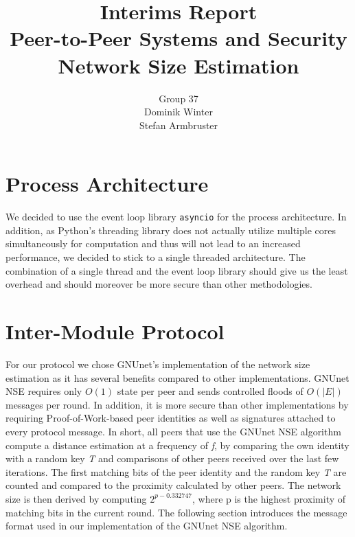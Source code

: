 \documentclass[IN,11pt,twoside,openright,english]{article}
\begin{document}
\title{%
  \Huge \textbf{Interims Report} \\
  \vspace{1.5cm} \large \textbf{Peer-to-Peer Systems and Security} \\
    \vspace{0.5cm} \textbf{Network Size Estimation} \vspace{1cm} }

\author{%
	\large Group 37 \\
	\large Dominik Winter \\
	\large Stefan Armbruster}
\date{}
\maketitle

\newpage

\section{Process Architecture}
We decided to use the event loop library \texttt{asyncio} for the process architecture. In addition, as Python's threading library does not actually utilize multiple cores simultaneously for computation and thus will not lead to an increased performance, we decided to stick to a single threaded architecture. The combination of a single thread and the event loop library should give us the least overhead and should moreover be more secure than other methodologies.



\section{Inter-Module Protocol}
For our protocol we chose GNUnet's implementation of the network size estimation \cite{nse:1} as it has several benefits compared to other implementations. GNUnet NSE requires only $O(1)$ state per peer and sends controlled floods of $O(|E|)$ messages per round. In addition, it is more secure than other implementations by requiring Proof-of-Work-based peer identities as well as signatures attached to every protocol message. \newline
\newline In short, all peers that use the GNUnet NSE algorithm compute a distance estimation at a frequency of \textit{f}, by comparing the own identity with a random key \textit{T} and comparisons of other peers received over the last few iterations. The first matching bits of the peer identity and the random key \textit{T} are counted and compared to the proximity calculated by other peers. The network size is then derived by computing $2^{p-0.332747}$, where p is the highest proximity of matching bits in the current round. \newline
\newline The following section introduces the message format used in our implementation of the GNUnet NSE algorithm.
\end{document}
